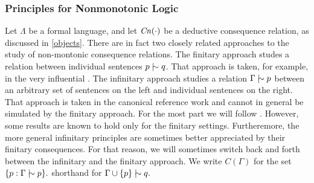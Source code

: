 \subsubsection{Principles for Nonmonotonic Logic }
\label{nonmonprinciples}

Let $\Lambda$ be a formal language, and let $\text{\textit{Cn}}(\cdot)$ be a deductive
consequence relation, as discussed in \autoref{objects}. There are in fact two
closely related approaches to the study of non-montonic consequence relations.
The finitary approach studes a relation between individual sentences $p \mathrel{\mid\hspace{-.08em}\!\sim} q$.
That approach is taken, for example, in the very influential
\citet{kraus1990nonmonotonic}. The infinitary approach studies a relation
$\Gamma \mathrel{\mid\hspace{-.08em}\!\sim} p$ between an arbitrary set of sentences on the left and individual
sentences on the right. That approach is taken in the canonical reference work
\citet{makinson1994general} and cannot in general be simulated by the finitary
approach. For the most part we will follow \citet{makinson1994general}. However,
some results are known to hold only for the finitary settings. Furtheremore, the
more general infinitary principles are sometimes better appreciated by their
finitary consequences. For that reason, we will  sometimes switch back and forth
between the infinitary and the finitary approach. We write $C(\Gamma)$ for the
set $ \{ p : \Gamma \mathrel{\mid\hspace{-.08em}\!\sim} p\}.$ %
shorthand for $\Gamma \cup \{ p \} \mathrel{\mid\hspace{-.08em}\!\sim} q.$

